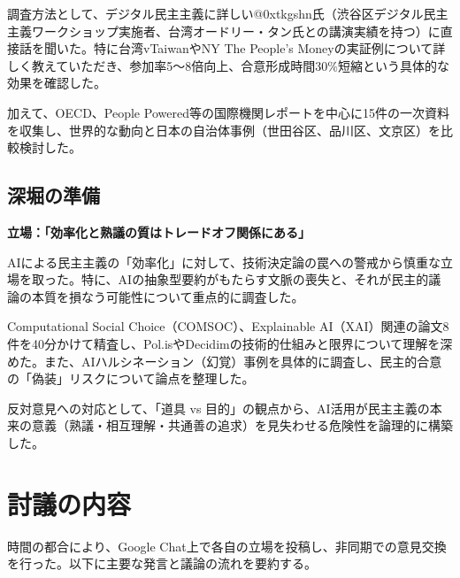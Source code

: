 \documentclass[12pt,a4j]{jarticle}
\begin{document}
調査方法として、デジタル民主主義に詳しい@0xtkgshn氏（渋谷区デジタル民主主義ワークショップ実施者、台湾オードリー・タン氏との講演実績を持つ）に直接話を聞いた。特に台湾vTaiwanやNY The People's Moneyの実証例について詳しく教えていただき、参加率5～8倍向上、合意形成時間30\%短縮という具体的な効果を確認した。

加えて、OECD、People Powered等の国際機関レポートを中心に15件の一次資料を収集し、世界的な動向と日本の自治体事例（世田谷区、品川区、文京区）を比較検討した。

\subsection{深堀の準備}
\textbf{立場：「効率化と熟議の質はトレードオフ関係にある」}

AIによる民主主義の「効率化」に対して、技術決定論の罠への警戒から慎重な立場を取った。特に、AIの抽象型要約がもたらす文脈の喪失と、それが民主的議論の本質を損なう可能性について重点的に調査した。

Computational Social Choice（COMSOC）、Explainable AI（XAI）関連の論文8件を40分かけて精査し、Pol.isやDecidimの技術的仕組みと限界について理解を深めた。また、AIハルシネーション（幻覚）事例を具体的に調査し、民主的合意の「偽装」リスクについて論点を整理した。

反対意見への対応として、「道具 vs 目的」の観点から、AI活用が民主主義の本来の意義（熟議・相互理解・共通善の追求）を見失わせる危険性を論理的に構築した。

\section{討議の内容}

時間の都合により、Google Chat上で各自の立場を投稿し、非同期での意見交換を行った。以下に主要な発言と議論の流れを要約する。
\end{document}
